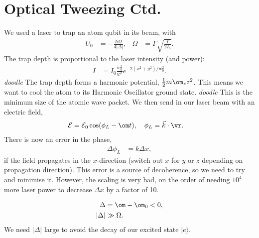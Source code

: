 \documentclass[a4paper, 11pt, normalem]{report}
\begin{document}
\section{Optical Tweezing Ctd.}
We used a laser to trap an atom qubit in its beam, with
\begin{align}
    U_0 &= -\frac{\hbar\Omega}{4|\Delta|}, & \Omega &= \Gamma\sqrt{\frac{I}{2I_s}}.
\end{align}
The trap depth is proportional to the laser intensity (and power):
\begin{align}
    I &= I_0\frac{w_0^2}{w^2}e^{-2(x^2+y^2)/w_0^2}.
\end{align}
\emph{doodle}
The trap depth forms a harmonic potential, $\frac12 m\om_zz^2$.
This means we want to cool the atom to its Harmonic Oscillator ground state.
\emph{doodle}
This is the minimum size of the atomic wave packet.
We then send in our laser beam with an electric field,
\begin{align}
    \mathcal{E} &= \mathcal{E}_0\cos(\phi_L-\om t),\quad \phi_L = \vec{k}\cdot\vr.
\end{align}
There is now an error in the phase,
\begin{align}
    \Delta\phi_L &= k\Delta x,
\end{align}
if the field propagates in the $x$-direction (switch out $x$ for $y$ or $z$ depending on propagation direction).
This error is a source of decoherence, so we need to try and minimise it.
However, the scaling is very bad, on the order of needing $10^4$ more laser power to decrease $\Delta x$ by a factor of 10.
\begin{figure}[H]
    \centering
\end{figure}
\vspace{-20pt}
\begin{align}
    \Delta &= \om-\om_0 < 0, \\
    |\Delta| &\gg \Omega.
\end{align}
We need $|\Delta|$ large to avoid the decay of our excited state $|e\rangle$.
\end{document}
